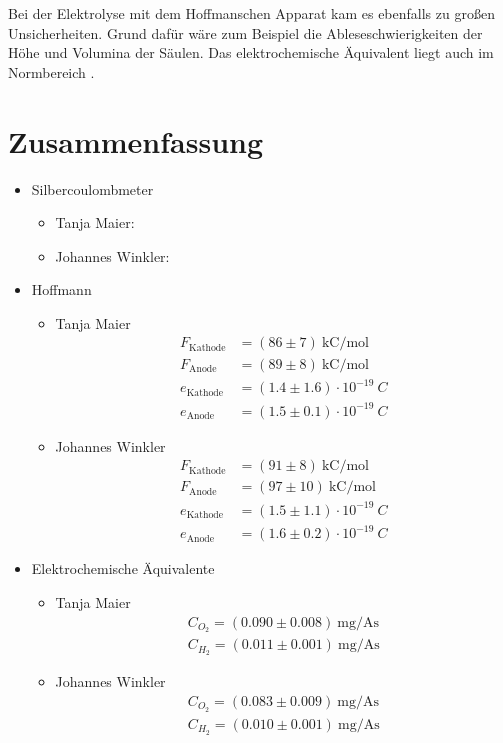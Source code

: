 \documentclass{article}
\begin{document}
Bei der Elektrolyse mit dem Hoffmanschen Apparat kam es ebenfalls zu großen Unsicherheiten. Grund dafür wäre zum Beispiel die Ableseschwierigkeiten der Höhe und Volumina der Säulen. Das elektrochemische Äquivalent liegt auch im Normbereich \cite{equiv}.

\section{Zusammenfassung}


\begin{itemize}

\item Silbercoulombmeter
\begin{itemize}
\item Tanja Maier:

\item Johannes Winkler:

\end{itemize}

\item Hoffmann
\begin{itemize}
\item Tanja Maier
\begin{align*}
F_\text{Kathode} &= (86 \pm 7)~\text{kC/mol}\\
F_\text{Anode} &= (89 \pm 8)~\text{kC/mol} \\
e_\text{Kathode} &= (1.4 \pm 1.6)\cdot 10^{-19}~C \\
e_\text{Anode} &= (1.5 \pm 0.1)\cdot 10^{-19}~C  
\end{align*}
\item Johannes Winkler
\begin{align*}
F_\text{Kathode} &= (91 \pm 8)~\text{kC/mol}\\
F_\text{Anode} &= (97 \pm 10)~\text{kC/mol} \\
e_\text{Kathode} &= (1.5 \pm 1.1)\cdot 10^{-19}~C \\
e_\text{Anode} &= (1.6 \pm 0.2)\cdot 10^{-19}~C  
\end{align*}

\end{itemize}
\item Elektrochemische Äquivalente
\begin{itemize}
\item Tanja Maier
\begin{align*}
C_{O_2} = (0.090 \pm 0.008)~\text{mg}/\text{As} \\
C_{H_2} = (0.011 \pm 0.001)~\text{mg}/\text{As} 
\end{align*}

\item Johannes Winkler
\begin{align*}
C_{O_2} = (0.083 \pm 0.009)~\text{mg}/\text{As} \\
C_{H_2} = (0.010 \pm 0.001)~\text{mg}/\text{As} 
\end{align*}

\end{itemize}
\end{itemize}
\end{document}
